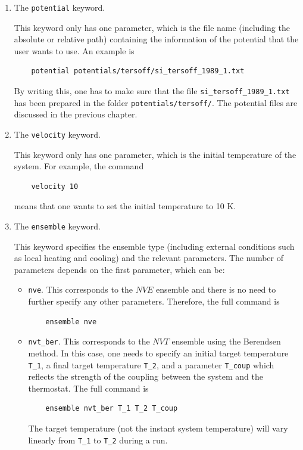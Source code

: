\documentclass[12pt,a4paper]{report}
\begin{document}
\begin{enumerate}

\item The \verb"potential" keyword.

This keyword only has one parameter, which is the file name (including the absolute or relative path) containing the information of the potential that the user wants to use. An example is
\begin{verbatim}
    potential potentials/tersoff/si_tersoff_1989_1.txt
\end{verbatim}
By writing this, one has to make sure that the file \verb"si_tersoff_1989_1.txt" has been prepared in the folder \verb"potentials/tersoff/".
The potential files are discussed in the previous chapter.


\item The \verb"velocity" keyword.

This keyword only has one parameter, which is the initial temperature of the system. For example, the command
\begin{verbatim}
    velocity 10
\end{verbatim}
means that one wants to set the initial temperature to 10 K.

\item The \verb"ensemble" keyword.

This keyword specifies the ensemble type (including external conditions such as local heating and cooling) and the relevant parameters. The number of parameters depends on the first parameter, which can be:
\begin{itemize}

\item \verb"nve". This corresponds to the $NVE$ ensemble and there is no need to further specify any other parameters. Therefore, the full command is
\begin{verbatim}
    ensemble nve
\end{verbatim}

\item \verb"nvt_ber". This corresponds to the $NVT$ ensemble using the Berendsen method. In this case, one needs to specify an initial target temperature \verb"T_1", a final target temperature \verb"T_2", and a parameter \verb"T_coup" which reflects the strength of the coupling between the system and the thermostat. The full command is
\begin{verbatim}
    ensemble nvt_ber T_1 T_2 T_coup
\end{verbatim}
The target temperature (not the instant system temperature) will vary linearly from \verb"T_1" to \verb"T_2" during a run.


\end{itemize}
\end{enumerate}
\end{document}

